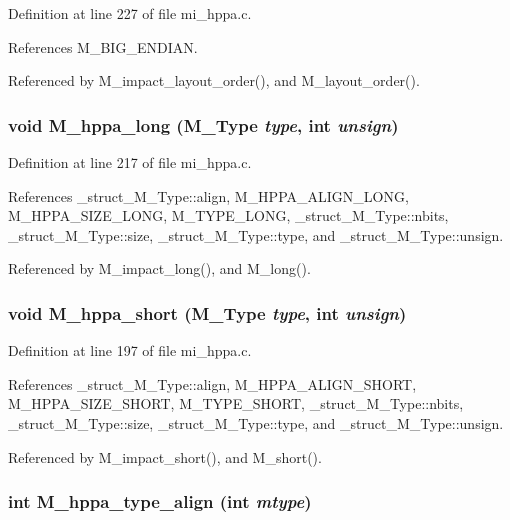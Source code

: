 Definition at line 227 of file mi\_\-hppa.c.

References M\_\-BIG\_\-ENDIAN.

Referenced by M\_\-impact\_\-layout\_\-order(), and M\_\-layout\_\-order().
\subsubsection{\setlength{\rightskip}{0pt plus 5cm}void M\_\-hppa\_\-long (\bf{M\_\-Type} {\em type}, int {\em unsign})}\label{mi__hppa_8c_27985b8000bb57a9650315ba36193157}




Definition at line 217 of file mi\_\-hppa.c.

References \_\-struct\_\-M\_\-Type::align, M\_\-HPPA\_\-ALIGN\_\-LONG, M\_\-HPPA\_\-SIZE\_\-LONG, M\_\-TYPE\_\-LONG, \_\-struct\_\-M\_\-Type::nbits, \_\-struct\_\-M\_\-Type::size, \_\-struct\_\-M\_\-Type::type, and \_\-struct\_\-M\_\-Type::unsign.

Referenced by M\_\-impact\_\-long(), and M\_\-long().
\subsubsection{\setlength{\rightskip}{0pt plus 5cm}void M\_\-hppa\_\-short (\bf{M\_\-Type} {\em type}, int {\em unsign})}\label{mi__hppa_8c_71252b95ead1065d55b2f2cd3063ad25}




Definition at line 197 of file mi\_\-hppa.c.

References \_\-struct\_\-M\_\-Type::align, M\_\-HPPA\_\-ALIGN\_\-SHORT, M\_\-HPPA\_\-SIZE\_\-SHORT, M\_\-TYPE\_\-SHORT, \_\-struct\_\-M\_\-Type::nbits, \_\-struct\_\-M\_\-Type::size, \_\-struct\_\-M\_\-Type::type, and \_\-struct\_\-M\_\-Type::unsign.

Referenced by M\_\-impact\_\-short(), and M\_\-short().
\subsubsection{\setlength{\rightskip}{0pt plus 5cm}int M\_\-hppa\_\-type\_\-align (int {\em mtype})}\label{mi__hppa_8c_29613fa80645c0fa246371f4c085d428}





